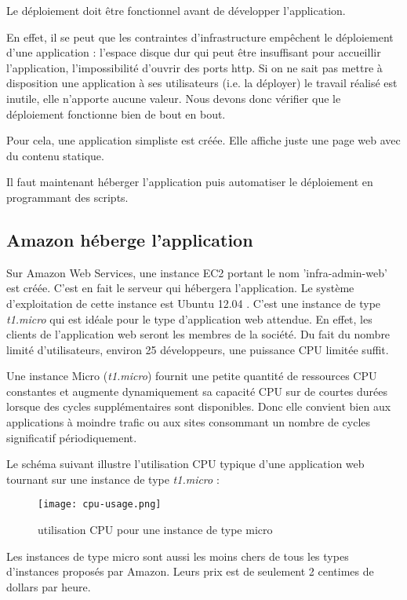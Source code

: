 Le déploiement doit être fonctionnel avant de développer l'application.

En effet, il se peut que les contraintes d'infrastructure empêchent
le déploiement d'une application : l'espace disque dur qui peut être insuffisant
pour accueillir l'application, l'impossibilité d'ouvrir des ports http.
Si on ne sait pas mettre à disposition une application à ses
utilisateurs (i.e. la déployer) le travail réalisé est inutile, elle n'apporte
aucune valeur.
Nous devons donc vérifier que le déploiement fonctionne bien de bout en bout.

Pour cela, une application simpliste est créée.
Elle affiche juste une page web avec du contenu statique.

Il faut maintenant héberger l'application puis automatiser le déploiement en
programmant des scripts.

\subsection{Amazon héberge l'application}

Sur Amazon Web Services, une instance EC2 portant le nom 'infra-admin-web' est
créée. C'est en fait le serveur qui hébergera l'application. Le
système d'exploitation de cette instance est Ubuntu 12.04 .
C'est une instance de type \textit{t1.micro} qui est idéale pour le type
d'application web attendue.
En effet, les clients de l'application web seront les membres de la société.
Du fait du nombre limité d'utilisateurs, environ 25 développeurs,
une puissance CPU limitée suffit.

Une instance Micro (\textit{t1.micro}) fournit une petite quantité de ressources CPU
constantes et augmente dynamiquement sa capacité CPU sur de courtes durées
lorsque des cycles supplémentaires sont disponibles. Donc elle convient bien
aux applications à moindre trafic ou aux sites consommant un nombre de cycles
significatif périodiquement.

Le schéma suivant illustre l'utilisation CPU typique d'une application web
tournant sur une instance de type \textit{t1.micro} :
\begin{figure}[H]
  \begin{center}
    \texttt{[image: cpu-usage.png]} 
  \end{center}
  \caption{utilisation CPU pour une instance de type micro}
\end{figure}

Les instances de type micro sont aussi les moins chers de tous les types
d'instances proposés par Amazon. Leurs prix est de seulement 2 centimes de
dollars par heure.


